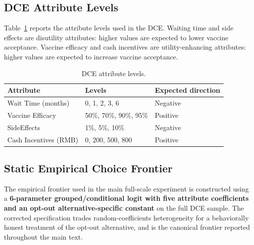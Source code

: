 \documentclass[11pt]{article}
\begin{document}
\subsection{DCE Attribute Levels}

Table~\ref{tab:dce_attributes} reports the attribute levels used in the DCE. Waiting time and side effects are disutility attributes: higher values are expected to lower vaccine acceptance. Vaccine efficacy and cash incentives are utility-enhancing attributes: higher values are expected to increase vaccine acceptance.

\begin{table}[htbp]
\centering
\caption{DCE attribute levels.}
\label{tab:dce_attributes}
\begin{tabular}{lll}
\hline
Attribute & Levels & Expected direction \\
\hline
Wait Time (months) & 0, 1, 2, 3, 6 & Negative \\
Vaccine Efficacy & 50\%, 70\%, 90\%, 95\% & Positive \\
SideEffects & 1\%, 5\%, 10\% & Negative \\
Cash Incentives (RMB) & 0, 200, 500, 800 & Positive \\
\hline
\end{tabular}
\end{table}

\subsection{Static Empirical Choice Frontier}

The empirical frontier used in the main full-scale experiment is constructed using a \textbf{6-parameter grouped/conditional logit with five attribute coefficients and an opt-out alternative-specific constant} on the full DCE sample. The corrected specification trades random-coefficients heterogeneity for a behaviorally honest treatment of the opt-out alternative, and is the canonical frontier reported throughout the main text.
\end{document}
